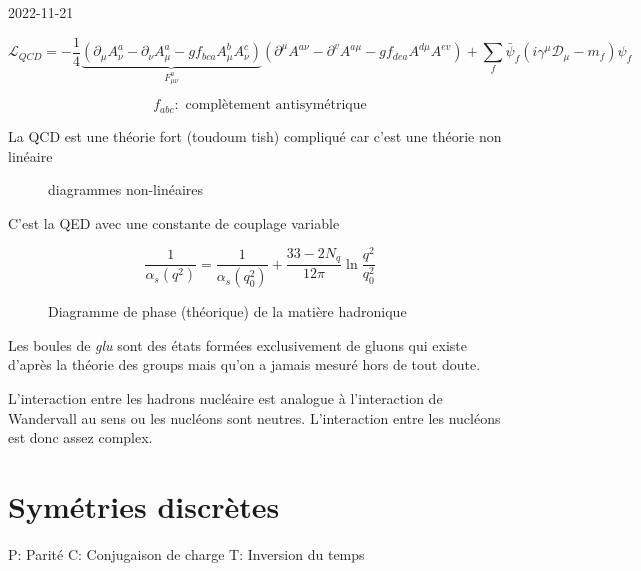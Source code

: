 


2022-11-21

\[ 	\mathscr{L}_{Q C D}=-\frac{1}{4}\underbrace{\left(\partial_\mu A_\nu^a-\partial_\nu A_\mu^a-g f_{b c a} A_\mu^b A_\nu^c\right)}_{F_{\mu\nu}^{a}} \left(\partial^\mu A^{a \nu}-\partial^v A^{a \mu}-g f_{d e a} A^{d \mu} A^{e v}\right) + \sum_f \bar \psi_f \left( i \gamma^{\mu}\mathcal{D}_\mu -m_f \right) \psi_f \]

\[ f_{abc} : \text{ complètement antisymétrique}   \]


La QCD est une théorie fort (toudoum tish) compliqué car c'est une théorie non linéaire


\begin{figure}[ht]
    \centering
    \caption{diagrammes non-linéaires}
    \label{fig:diagrammes-non-linéaires}
\end{figure}

C'est la QED avec une constante de couplage variable

\[ \frac{1}{\alpha_s\left(q^2\right)}=\frac{1}{\alpha_s\left(q_0^2\right)}+\frac{33-2 N_q}{12 \pi} \ln \frac{q^2}{q_0^2} \]

\begin{figure}[ht]
    \centering
    \caption{Diagramme de phase (théorique) de la matière hadronique}
    \label{fig:diagramme-de-phase-(théorique)-de-la-matière-hadronique}
\end{figure}

Les boules de \textit{glu} sont des états formées exclusivement de gluons qui existe d'après la théorie des groups mais qu'on a jamais mesuré hors de tout doute.


L'interaction entre les hadrons nucléaire est analogue à l'interaction de Wandervall au sens ou les nucléons sont neutres. L'interaction entre les nucléons est donc assez complex.

\section*{Symétries discrètes}

\begin{tcolorbox}[title=]
	 \begin{center}
	 P: Parité \qquad C: Conjugaison de charge \qquad T: Inversion du temps
	 \end{center}
\end{tcolorbox}


